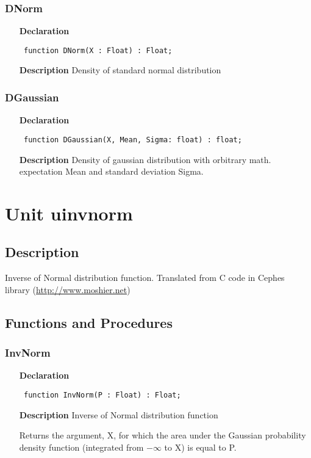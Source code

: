 \documentclass[12pt,a4paper,oneside]{report}
\newcommand{\lmath}[1]{   %
	\marginpar{\vspace{#1} 
		\begin{flushright}
			LMath
	\end{flushright} }
}
\newcommand{\declarationitem}[1]{\textbf{#1}}
\newcommand{\descriptiontitle}[1]{\textbf{#1}}
\newcommand{\code}[1]{\texttt{#1}}
\begin{document}
\subsubsection{DNorm}
\label{unormal-DNorm}
\begin{itemize}\item[\declarationitem{Declaration}\hfill]
	\begin{flushleft}
		\code{
			function DNorm(X : Float) : Float;}
	\end{flushleft}
	\item[\descriptiontitle{Description}]
	Density of standard normal distribution
\end{itemize}
\subsubsection{DGaussian}\lmath{-24pt}
\label{unormal-DGaussian}
\begin{itemize}\item[\declarationitem{Declaration}\hfill]
	\begin{flushleft}
		\code{
			function DGaussian(X, Mean, Sigma: float) : float;}
	\end{flushleft}
	\item[\descriptiontitle{Description}]
	Density of gaussian distribution with orbitrary math. expectation Mean and standard deviation Sigma.
\end{itemize}
\section{Unit uinvnorm}
\label{uinvnorm}
\subsection{Description}
Inverse of Normal distribution function. 
Translated from C code in Cephes library (\href{http://www.moshier.net}{http://www.moshier.net}) \subsection{Functions and Procedures}
\subsubsection{InvNorm}
\label{uinvnorm-InvNorm}
\begin{itemize}\item[\declarationitem{Declaration}\hfill]
	\begin{flushleft}
		\code{
			function InvNorm(P : Float) : Float;}
	\end{flushleft}
	\item[\descriptiontitle{Description}]
	Inverse of Normal distribution function
	
	Returns the argument, X, for which the area under the Gaussian probability density function (integrated from $-\infty$ to X) is equal to P.
\end{itemize}
\end{document}
